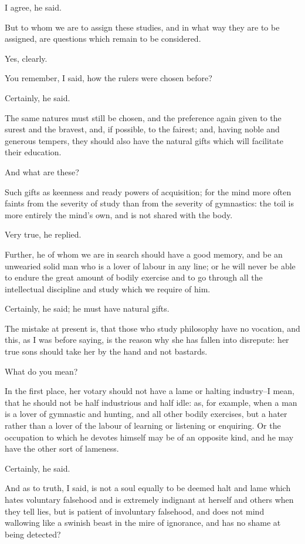 I agree, he said.

But to whom we are to assign these studies, and in what way they are to
be assigned, are questions which remain to be considered.

Yes, clearly.

You remember, I said, how the rulers were chosen before?

Certainly, he said.

The same natures must still be chosen, and the preference again given
to the surest and the bravest, and, if possible, to the fairest; and,
having noble and generous tempers, they should also have the natural
gifts which will facilitate their education.

And what are these?

Such gifts as keenness and ready powers of acquisition; for the mind
more often faints from the severity of study than from the severity of
gymnastics: the toil is more entirely the mind's own, and is not shared
with the body.

Very true, he replied.

Further, he of whom we are in search should have a good memory, and be
an unwearied solid man who is a lover of labour in any line; or he will
never be able to endure the great amount of bodily exercise and to go
through all the intellectual discipline and study which we require of
him.

Certainly, he said; he must have natural gifts.

The mistake at present is, that those who study philosophy have no
vocation, and this, as I was before saying, is the reason why she has
fallen into disrepute: her true sons should take her by the hand and not
bastards.

What do you mean?

In the first place, her votary should not have a lame or halting
industry--I mean, that he should not be half industrious and half idle:
as, for example, when a man is a lover of gymnastic and hunting, and all
other bodily exercises, but a hater rather than a lover of the labour
of learning or listening or enquiring. Or the occupation to which he
devotes himself may be of an opposite kind, and he may have the other
sort of lameness.

Certainly, he said.

And as to truth, I said, is not a soul equally to be deemed halt and
lame which hates voluntary falsehood and is extremely indignant at
herself and others when they tell lies, but is patient of involuntary
falsehood, and does not mind wallowing like a swinish beast in the mire
of ignorance, and has no shame at being detected?

